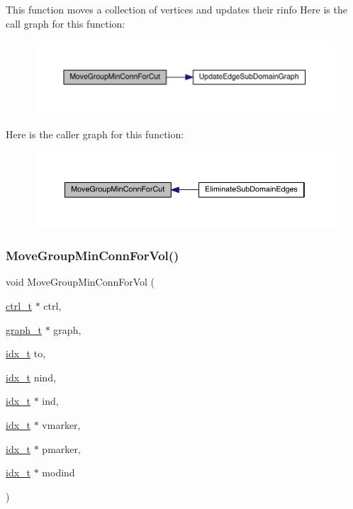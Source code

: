 This function moves a collection of vertices and updates their rinfo Here is the call graph for this function\+:\nopagebreak
\begin{figure}[H]
\begin{center}
\leavevmode
\includegraphics[width=350pt]{a00945_a39d997df18cf07ea8609a66db133a8b6_cgraph}
\end{center}
\end{figure}
Here is the caller graph for this function\+:\nopagebreak
\begin{figure}[H]
\begin{center}
\leavevmode
\includegraphics[width=350pt]{a00945_a39d997df18cf07ea8609a66db133a8b6_icgraph}
\end{center}
\end{figure}
\mbox{\label{a00945_acab0293e31c438218cd4b37b608466c6}} 
\subsubsection{\texorpdfstring{Move\+Group\+Min\+Conn\+For\+Vol()}{MoveGroupMinConnForVol()}}
{\footnotesize\ttfamily void Move\+Group\+Min\+Conn\+For\+Vol (\begin{DoxyParamCaption}\item[{\hyperlink{a00742}{ctrl\+\_\+t} $\ast$}]{ctrl,  }\item[{\hyperlink{a00734}{graph\+\_\+t} $\ast$}]{graph,  }\item[{\hyperlink{a00876_aaa5262be3e700770163401acb0150f52}{idx\+\_\+t}}]{to,  }\item[{\hyperlink{a00876_aaa5262be3e700770163401acb0150f52}{idx\+\_\+t}}]{nind,  }\item[{\hyperlink{a00876_aaa5262be3e700770163401acb0150f52}{idx\+\_\+t} $\ast$}]{ind,  }\item[{\hyperlink{a00876_aaa5262be3e700770163401acb0150f52}{idx\+\_\+t} $\ast$}]{vmarker,  }\item[{\hyperlink{a00876_aaa5262be3e700770163401acb0150f52}{idx\+\_\+t} $\ast$}]{pmarker,  }\item[{\hyperlink{a00876_aaa5262be3e700770163401acb0150f52}{idx\+\_\+t} $\ast$}]{modind }\end{DoxyParamCaption})}

